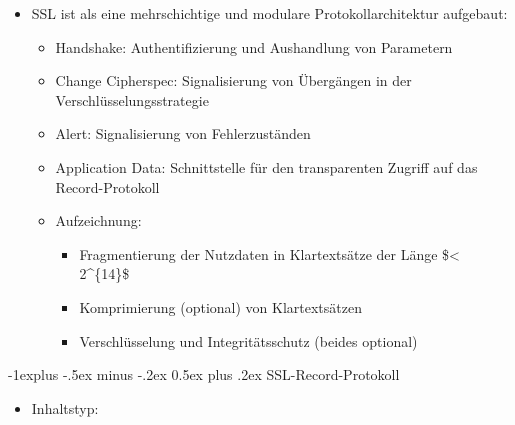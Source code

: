 \documentclass[a4paper]{article}
\makeatletter
\renewcommand{\subsection}{\@startsection{subsection}{2}{0mm}%
 {-1explus -.5ex minus -.2ex}%
 {0.5ex plus .2ex}%
 {\normalfont\normalsize\bfseries}}
\makeatother
\begin{document}
\begin{multicols}{3}

    \begin{itemize}
        \item
              SSL ist als eine mehrschichtige und modulare Protokollarchitektur
              aufgebaut:

              \begin{itemize}
                  \item
                        Handshake: Authentifizierung und Aushandlung von Parametern
                  \item
                        Change Cipherspec: Signalisierung von Übergängen in der
                        Verschlüsselungsstrategie
                  \item
                        Alert: Signalisierung von Fehlerzuständen
                  \item
                        Application Data: Schnittstelle für den transparenten Zugriff auf
                        das Record-Protokoll
                  \item
                        Aufzeichnung:

                        \begin{itemize}
                            \item
                                  Fragmentierung der Nutzdaten in Klartextsätze der Länge
                                  \$\textless{} 2\^{}\{14\}\$
                            \item
                                  Komprimierung (optional) von Klartextsätzen
                            \item
                                  Verschlüsselung und Integritätsschutz (beides optional)
                        \end{itemize}
              \end{itemize}
    \end{itemize}


    \subsection{SSL-Record-Protokoll}


    \begin{itemize}
        \item
              Inhaltstyp:


\end{itemize}
\end{multicols}
\end{document}
